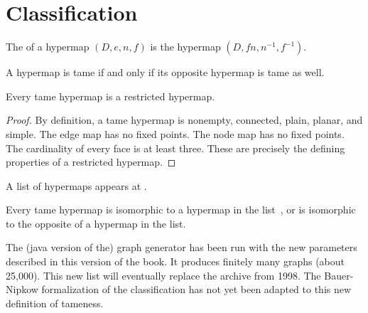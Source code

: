 \section{Classification}
\label{sec:proof-classification}

\label{sec:classification}




\begin{definition}[opposite]
The  of a hypermap $(D,e,n,f)$ is the
hypermap $(D,f n,n^{-1},f^{-1})$.
%
\end{definition}

\begin{lemma}[]
A hypermap is tame if and only if its opposite hypermap is tame as well.
\end{lemma}

\begin{lemma}[]
Every tame hypermap is a restricted hypermap.
\end{lemma}

\begin{proof}
  By definition, a tame hypermap is nonempty, connected, plain,
  planar, and simple.  The edge map has no fixed points.  The node map
  has no fixed points.  The cardinality of every face is at least
  three.  These are precisely the defining properties of a restricted
  hypermap.
\end{proof}


A list of hypermaps appears at \cite{website:Hales:1998:Code}.

\begin{theorem}
  \label{theorem:classification} Every tame hypermap is isomorphic to
  a hypermap in the list~\cite{website:Hales:1998:Code}, or is
  isomorphic to the opposite of a hypermap in the list.
\end{theorem}

\begin{note}%
  The (java version of the) graph generator has been run with the new
  parameters described in this version of the book.  It produces
  finitely many graphs (about 25,000).  This new list will eventually
  replace the archive from 1998.  The Bauer-Nipkow formalization of
  the classification has not yet been adapted to this new definition
  of tameness.  %
\end{note}


